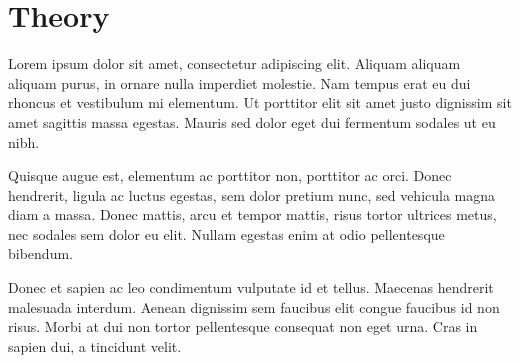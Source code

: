 
\chapter{Theory}

Lorem ipsum dolor sit amet, consectetur adipiscing elit. Aliquam aliquam aliquam purus, in ornare nulla imperdiet molestie. Nam tempus erat eu dui rhoncus et vestibulum mi elementum. Ut porttitor elit sit amet justo dignissim sit amet sagittis massa egestas. Mauris sed dolor eget dui fermentum sodales ut eu nibh. 

Quisque augue est, elementum ac porttitor non, porttitor ac orci. Donec hendrerit, ligula ac luctus egestas, sem dolor pretium nunc, sed vehicula magna diam a massa. Donec mattis, arcu et tempor mattis, risus tortor ultrices metus, nec sodales sem dolor eu elit. Nullam egestas enim at odio pellentesque bibendum. 

Donec et sapien ac leo condimentum vulputate id et tellus. Maecenas hendrerit malesuada interdum. Aenean dignissim sem faucibus elit congue faucibus id non risus. Morbi at dui non tortor pellentesque consequat non eget urna. Cras in sapien dui, a tincidunt velit.

\clearpage %
